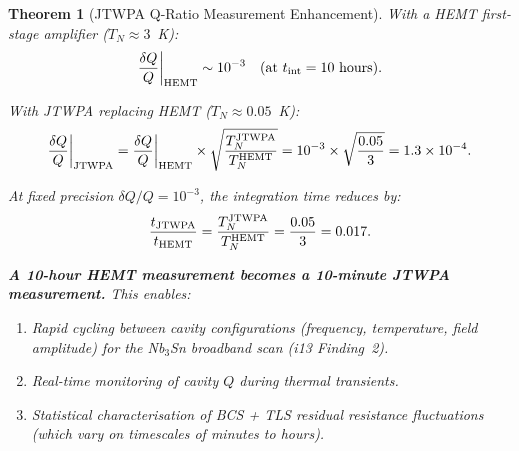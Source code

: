 \documentclass[11pt]{article}
\newcommand{\ee}[1]{\times 10^{#1}}
\newtheorem{theorem}{Theorem}[section]
\theoremstyle{definition}
\theoremstyle{remark}
\begin{document}
\begin{theorem}[JTWPA Q-Ratio Measurement Enhancement]
\label{thm:JTWPA}
With a HEMT first-stage amplifier ($T_N \approx 3$~K):
\begin{equation}
\frac{\delta Q}{Q}\bigg|_{\rm HEMT} \sim 10^{-3}
\quad \text{(at $t_{\rm int} = 10$~hours)}.
\end{equation}

With JTWPA replacing HEMT ($T_N \approx 0.05$~K):
\begin{equation}
\frac{\delta Q}{Q}\bigg|_{\rm JTWPA} = \frac{\delta Q}{Q}\bigg|_{\rm HEMT}
\times\sqrt{\frac{T_N^{\rm JTWPA}}{T_N^{\rm HEMT}}}
= 10^{-3}\times\sqrt{\frac{0.05}{3}} = 1.3\ee{-4}.
\end{equation}

At fixed precision $\delta Q/Q = 10^{-3}$, the integration time
reduces by:
\begin{equation}
\frac{t_{\rm JTWPA}}{t_{\rm HEMT}} = \frac{T_N^{\rm JTWPA}}{T_N^{\rm HEMT}}
= \frac{0.05}{3} = 0.017.
\end{equation}

\textbf{A 10-hour HEMT measurement becomes a 10-minute JTWPA
measurement.} This enables:
\begin{enumerate}[nosep]
\item Rapid cycling between cavity configurations (frequency,
  temperature, field amplitude) for the Nb$_3$Sn broadband scan
  (i13 Finding~2).
\item Real-time monitoring of cavity $Q$ during thermal transients.
\item Statistical characterisation of BCS + TLS residual resistance
  fluctuations (which vary on timescales of minutes to hours).
\end{enumerate}
\end{theorem}
\end{document}
